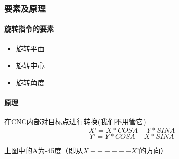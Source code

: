 \subsubsection{要素及原理}
\paragraph{旋转指令的要素}
\begin{itemize}
\item 旋转平面
\item 旋转中心
\item 旋转角度
\end{itemize}
\paragraph{原理}
在CNC内部对目标点进行转换(我们不用管它)
$$X’=X*COSA+Y*SINA$$
$$Y’=Y*COSA-X*SINA$$

上图中的A为-45度（即从$X------X’$的方向）
